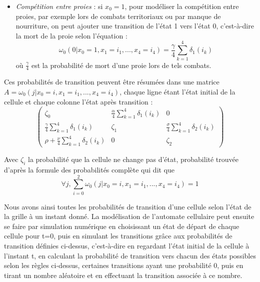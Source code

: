 \begin {itemize}
\vspace{0.3cm}
\item \textit{Compétition entre proies} : si $x_0=1$, pour modéliser la compétition entre proies, par exemple lors de combats territoriaux ou par manque de nourriture, on peut ajouter une transition de l'état 1 vers l'état 0, c'est-à-dire la mort de la proie selon l'équation : \begin{equation}\omega_0(0|x_0=1, x_1=i_1, ..., x_4=i_4)=\frac{\gamma}{4}\sum_{k=1}^{4}\delta_{1}(i_k)\end{equation} où $\frac{\gamma}{4}$ est la probabilité de mort d'une proie lors de tels combats.

\end{itemize}
\vspace{0.3cm}
Ces probabilités de transition peuvent être résumées dans une matrice $A=\omega_0(j|x_0=i, x_1=i_1, ..., x_4=i_4)$, chaque ligne étant l'état initial de la cellule et chaque colonne l'état après transition : 
\begin{equation}
    \begin{pmatrix}
        \zeta_0 & \frac{\alpha}{4}\sum_{k=1}^{4}\delta_{1}(i_k) & 0 \\
        \frac{\gamma}{4}\sum_{k=1}^{4}\delta_{1}(i_k) & \zeta_1 & \frac{\sigma}{4}\sum_{k=1}^{4}\delta_{2}(i_k) \\
        \rho + \frac{\nu}{4}\sum_{k=1}^{4}\delta_{2}(i_k) & 0 & \zeta_2
    \end{pmatrix}
\end{equation}


Avec $\zeta_i$ la probabilité que la cellule ne change pas d'état, probabilité trouvée d'après la formule des probabilités complète qui dit que \begin{equation}
\forall j, \sum_{i=0}^2\omega_0(j|x_0=i, x_1=i_1, ..., x_4=i_4)=1\end{equation}

\vspace{0.3cm}
Nous avons ainsi toutes les probabilités de transition d'une cellule selon l'état de la grille à un instant donné. La modélisation de l'automate cellulaire peut ensuite se faire par simulation numérique en choisissant un état de départ de chaque cellule pour t=0, puis en simulant les transitions grâce aux probabilités de transition définies ci-dessus, c'est-à-dire en regardant l'état initial de la cellule à l'instant t, en calculant la probabilité de transition vers chacun des états possibles selon les règles ci-dessus, certaines transitions ayant une probabilité 0, puis en tirant un nombre aléatoire et en effectuant la transition associée à ce nombre. 
